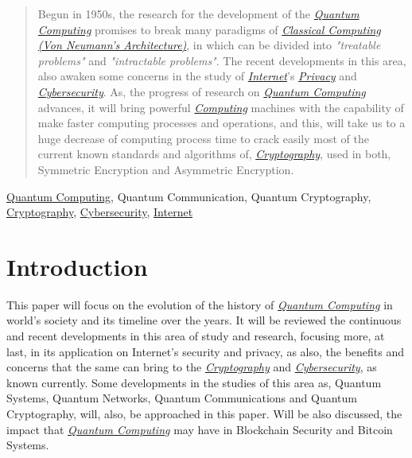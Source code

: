 \documentclass[conference]{IEEEtran}
\begin{document}
\begin{abstract}
Begun in 1950s, the research for the development of the \href{https://en.wikipedia.org/wiki/Quantum_computing}{\textit{Quantum Computing}} promises to break many paradigms of \href{https://en.wikipedia.org/wiki/Von_Neumann_architecture}{\textit{Classical Computing (Von Neumann's Architecture)}}, in which can be divided into \textit{"treatable problems"} and \textit{"intractable problems"}. The recent developments in this area, also awaken some concerns in the study of \href{https://en.wikipedia.org/wiki/Internet}{\textit{Internet}}'s \href{https://en.wikipedia.org/wiki/Privacy}{\textit{Privacy}} and \href{https://en.wikipedia.org/wiki/Computer_security}{\textit{Cybersecurity}}. As, the progress of research on \href{https://en.wikipedia.org/wiki/Quantum_computing}{\textit{Quantum Computing}} advances, it will bring powerful \href{https://en.wikipedia.org/wiki/Computing}{\textit{Computing}} machines with the capability of make faster computing processes and operations, and this, will take us to a huge decrease of computing process time to crack easily most of the current known standards and algorithms of, \href{https://en.wikipedia.org/wiki/Cryptography}{\textit{Cryptography}}, used in both, Symmetric Encryption and Asymmetric Encryption.
\end{abstract}

\begin{IEEEkeywords}
\href{https://en.wikipedia.org/wiki/Quantum_computing}{Quantum Computing}, Quantum Communication, Quantum Cryptography, \href{https://en.wikipedia.org/wiki/Cryptography}{Cryptography}, \href{https://en.wikipedia.org/wiki/Computer_security}{Cybersecurity}, \href{https://en.wikipedia.org/wiki/Internet}{Internet}
\end{IEEEkeywords}

\section{Introduction}
This paper will focus on the evolution of the history of \href{https://en.wikipedia.org/wiki/Quantum_computing}{\textit{Quantum Computing}} in world's society and its timeline over the years. It will be reviewed the continuous and recent developments in this area of study and research, focusing more, at last, in its application on Internet's security and privacy, as also, the benefits and concerns that the same can bring to the \href{https://en.wikipedia.org/wiki/Cryptography}{\textit{Cryptography}} and \href{https://en.wikipedia.org/wiki/Computer_security}{\textit{Cybersecurity}}, as known currently. Some developments in the studies of this area as, Quantum Systems, Quantum Networks, Quantum Communications and Quantum Cryptography, will, also, be approached in this paper. Will be also discussed, the impact that \href{https://en.wikipedia.org/wiki/Quantum_computing}{\textit{Quantum Computing}} may have in Blockchain Security and Bitcoin Systems. 
\end{document}
